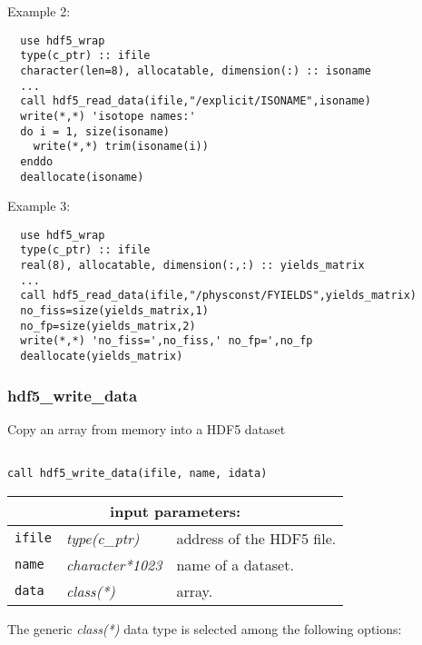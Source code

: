 \noindent Example 2:
\begin{verbatim}
  use hdf5_wrap
  type(c_ptr) :: ifile
  character(len=8), allocatable, dimension(:) :: isoname
  ...
  call hdf5_read_data(ifile,"/explicit/ISONAME",isoname)
  write(*,*) 'isotope names:'
  do i = 1, size(isoname)
    write(*,*) trim(isoname(i))
  enddo
  deallocate(isoname)
\end{verbatim}

\vskip 0.3cm

\noindent Example 3:
\begin{verbatim}
  use hdf5_wrap
  type(c_ptr) :: ifile
  real(8), allocatable, dimension(:,:) :: yields_matrix
  ...
  call hdf5_read_data(ifile,"/physconst/FYIELDS",yields_matrix)
  no_fiss=size(yields_matrix,1)
  no_fp=size(yields_matrix,2)
  write(*,*) 'no_fiss=',no_fiss,' no_fp=',no_fp
  deallocate(yields_matrix)
\end{verbatim}

\subsubsection{hdf5\_write\_data}

Copy an array from memory into a HDF5 dataset

\begin{verbatim}

call hdf5_write_data(ifile, name, idata)
\end{verbatim}

\noindent
\begin{tabular}{|p{1.5cm}|p{3cm}|p{10cm}|}
\hline
\multicolumn{3}{|c|}{\bf input parameters:} \\
\hline
{\tt ifile} & {\it type(c\_ptr)} & address of the HDF5 file. \\
\hline
{\tt name} & {\it character*1023} & name of a dataset. \\
\hline
{\tt data} & {\it class(*)} & array.\\
\hline
\end{tabular}

\vskip 0.5cm
\goodbreak

\noindent The generic {\it class(*)} data type is selected among the following options:

